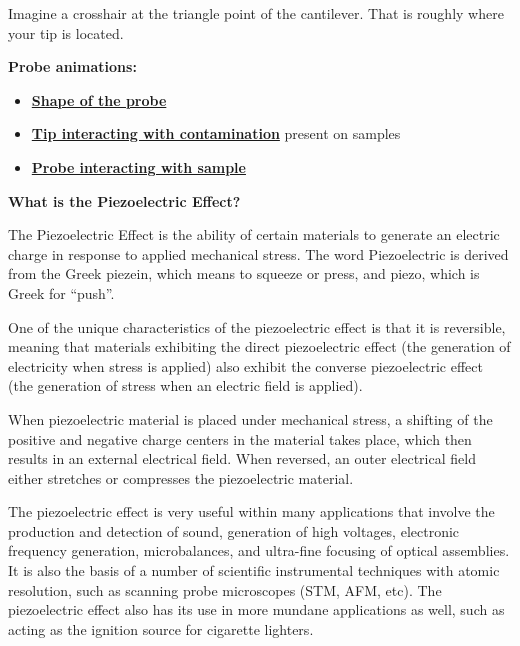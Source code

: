 \documentclass{../lab}
\begin{document}
Imagine a crosshair at the triangle point of the cantilever. That is roughly where your tip is located.

\textbf{Probe animations:}

\begin{itemize}
    \item \href{http://experimentationlab.berkeley.edu/sites/default/files/AFMImages/5.2.\%20Probe\%20Shape\%20-\%20Hole.flv\_converted.mp4}{\textbf{Shape of the probe}}

    \item \href{http://experimentationlab.berkeley.edu/sites/default/files/AFMImages/5.1\%20Contamination.flv\_converted.mp4}{\textbf{Tip interacting with contamination}} present on samples

    \item \href{http://experimentationlab.berkeley.edu/sites/default/files/AFMImages/5.3.\%20Probe\%20Sample\%20Bump.flv\_converted.mp4}{\textbf{Probe interacting with sample}}

\end{itemize}

\textbf{What is the Piezoelectric Effect?}
\label{subsubsec:Piezo}

The Piezoelectric Effect is the ability of certain materials to generate an electric charge in response to applied mechanical stress. The word Piezoelectric is derived from the Greek piezein, which means to squeeze or press, and piezo, which is Greek for “push”.

One of the unique characteristics of the piezoelectric effect is that it is reversible, meaning that materials exhibiting the direct piezoelectric effect (the generation of electricity when stress is applied) also exhibit the converse piezoelectric effect (the generation of stress when an electric field is applied).

When piezoelectric material is placed under mechanical stress, a shifting of the positive and negative charge centers in the material takes place, which then results in an external electrical field. When reversed, an outer electrical field either stretches or compresses the piezoelectric material.

The piezoelectric effect is very useful within many applications that involve the production and detection of sound, generation of high voltages, electronic frequency generation, microbalances, and ultra-fine focusing of optical assemblies. It is also the basis of a number of scientific instrumental techniques with atomic resolution, such as scanning probe microscopes (STM, AFM, etc). The piezoelectric effect also has its use in more mundane applications as well, such as acting as the ignition source for cigarette lighters. 
\end{document}
